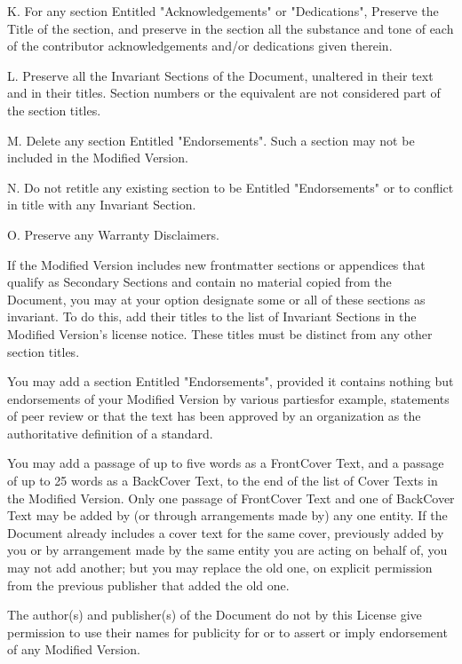 \documentclass[a4paper,11pt]{report}
\begin{document}
{ K. For any section Entitled "Acknowledgements" or "Dedications", Preserve the
Title of the section, and preserve in the section all the substance and tone
of each of the contributor acknowledgements and/or dedications given therein. 

 L. Preserve all the Invariant Sections of the Document, unaltered in their
text and in their titles. Section numbers or the equivalent are not considered
part of the section titles. 

 M. Delete any section Entitled "Endorsements". Such a section may not be
included in the Modified Version. 

 N. Do not retitle any existing section to be Entitled "Endorsements" or to
conflict in title with any Invariant Section. 

 O. Preserve any Warranty Disclaimers. 

 If the Modified Version includes new front\texttt{}matter sections
or appendices that qualify as Secondary Sections and contain no material
copied from the Document, you may at your option designate some or all of
these sections as invariant. To do this, add their titles to the list of
Invariant Sections in the Modified Version's license notice. These titles must
be distinct from any other section titles. 

 You may add a section Entitled "Endorsements", provided it contains nothing
but endorsements of your Modified Version by various
parties\texttt{}\texttt{}for example, statements of peer
review or that the text has been approved by an organization as the
authoritative definition of a standard. 

 You may add a passage of up to five words as a Front\texttt{}Cover
Text, and a passage of up to 25 words as a Back\texttt{}Cover Text,
to the end of the list of Cover Texts in the Modified Version. Only one
passage of Front\texttt{}Cover Text and one of
Back\texttt{}Cover Text may be added by (or through arrangements
made by) any one entity. If the Document already includes a cover text for the
same cover, previously added by you or by arrangement made by the same entity
you are acting on behalf of, you may not add another; but you may replace the
old one, on explicit permission from the previous publisher that added the old
one. 

 The author(s) and publisher(s) of the Document do not by this License give
permission to use their names for publicity for or to assert or imply
endorsement of any Modified Version. 

}
\end{document}
